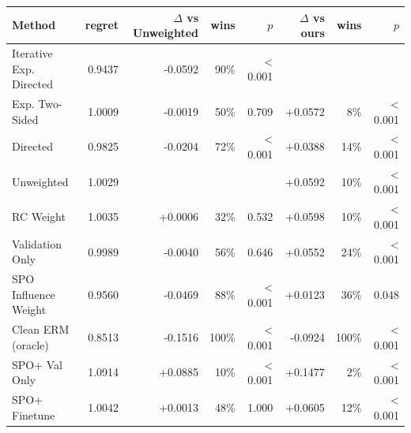 \begin{tabular}{lrrrrrrr}
\toprule
Method & regret & $\Delta$ vs Unweighted & wins & $p$ & $\Delta$ vs ours & wins & $p$ \\
\midrule
Iterative Exp. Directed & 0.9437 & -0.0592 & 90\% & < 0.001 &  &  &  \\
Exp. Two-Sided & 1.0009 & -0.0019 & 50\% & 0.709 & +0.0572 & 8\% & < 0.001 \\
Directed & 0.9825 & -0.0204 & 72\% & < 0.001 & +0.0388 & 14\% & < 0.001 \\
Unweighted & 1.0029 &  &  &  & +0.0592 & 10\% & < 0.001 \\
RC Weight & 1.0035 & +0.0006 & 32\% & 0.532 & +0.0598 & 10\% & < 0.001 \\
Validation Only & 0.9989 & -0.0040 & 56\% & 0.646 & +0.0552 & 24\% & < 0.001 \\
SPO Influence Weight & 0.9560 & -0.0469 & 88\% & < 0.001 & +0.0123 & 36\% & 0.048 \\
Clean ERM (oracle) & 0.8513 & -0.1516 & 100\% & < 0.001 & -0.0924 & 100\% & < 0.001 \\
SPO+ Val Only & 1.0914 & +0.0885 & 10\% & < 0.001 & +0.1477 & 2\% & < 0.001 \\
SPO+ Finetune & 1.0042 & +0.0013 & 48\% & 1.000 & +0.0605 & 12\% & < 0.001 \\
\bottomrule
\end{tabular}
